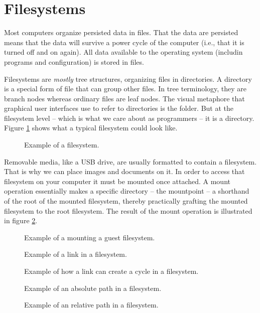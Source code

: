 \section{Filesystems}

Most computers organize persisted data in files. That the data are persisted means that the data will survive a power cycle of the computer (i.e., that it is turned off and on again). All data available to the operating system (includin programs and configuration) is stored in files.

Filesystems are \textsl{mostly} tree structures, organizing files in directories. A directory is a special form of file that can group other files. In tree terminology, they are branch nodes whereas ordinary files are leaf nodes. The visual metaphore that graphical user interfaces use to refer to directories is the folder. But at the filesystem level -- which is what we care about as programmers -- it is a directory. Figure \ref{fig:bs:fs} shows what a typical filesystem could look like.

\begin{figure}[tbp]
  
  \caption{Example of a filesystem.}
  \label{fig:bs:fs}
\end{figure}

Removable media, like a USB drive, are usually formatted to contain a filesystem. That is why we can place images and documents on it. In order to access that filesystem on your computer it must be mounted once attached. A mount operation essentially makes a specific directory -- the mountpoint -- a shorthand of the root of the mounted filesystem, thereby practically grafting the mounted filesystem to the root filesystem. The result of the mount operation is illustrated in figure \ref{fig:bs:fs:mounting}.

\begin{figure}[tbp]
  
  \caption{Example of a mounting a guest filesystem.}
  \label{fig:bs:fs:mounting}
\end{figure}

\begin{figure}[tbp]
  
  \caption{Example of a link in a filesystem.}
  \label{fig:bs:fs:links}
\end{figure}

\begin{figure}[tbp]
  
  \caption{Example of how a link can create a cycle in a filesystem.}
  \label{fig:bs:fs:cycles}
\end{figure}

\begin{figure}[tbp]
  
  \caption{Example of an absolute path in a filesystem.}
  \label{fig:bs:fs:path:abs}
\end{figure}

\begin{figure}[tbp]
  
  \caption{Example of an relative path in a filesystem.}
  \label{fig:bs:fs:path:rel}
\end{figure}

